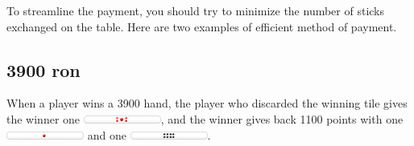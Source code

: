 \bigskip
To streamline the payment, you should try to minimize the number of sticks exchanged on the table. Here are two examples of efficient method of payment.

\subsection*{3900 {\jap ron}}
When a player wins a 3900 hand, the player who discarded the winning tile gives the winner one \includegraphics[width=1in]{figs/tenbou5000}, and the winner gives  back 1100 points with one \includegraphics[width=1in]{figs/tenbou1000} and one \includegraphics[width=1in]{figs/tenbou100}.


